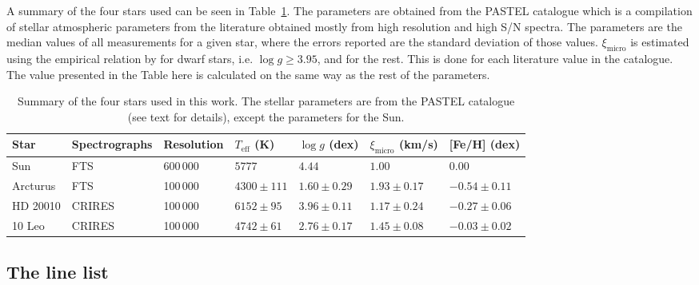 \documentclass{aa}
\begin{document}
A summary of the four stars used can be seen in Table~\ref{tab:stars}. The
parameters are obtained from the PASTEL catalogue \citep{Soubiran2016} which is
a compilation of stellar atmospheric parameters from the literature obtained
mostly from high resolution and high S/N spectra. The parameters are the median
values of all measurements for a given star, where the errors reported are the
standard deviation of those values. $\xi_\mathrm{micro}$ is estimated using the
empirical relation by \citet{Tsantaki2013} for dwarf stars, i.e. $\log
g\ge3.95$, and \citet{Adibekyan2015} for the rest. This is done for each
literature value in the catalogue. The value presented in the Table here is
calculated on the same way as the rest of the parameters.
\begin{table}[htb!]
    \caption{Summary of the four stars used in this work. The stellar parameters
             are from the PASTEL catalogue \citep{Soubiran2016} (see text for
             details), except the parameters for the Sun.}
    \label{tab:stars}
    \centering
    \begin{tabular}{lllllll}
      \hline\hline
        Star        & Spectrographs  & Resolution  & $T_\mathrm{eff}$ (K) &  $\log g$ (dex)  &   $\xi_\mathrm{micro}$ (km/s)   & [Fe/H] (dex)      \\
      \hline
        Sun         & FTS            & 600\,000    & $5777$               &  $4.44$          &    $1.00$                       & $ 0.00$          \\
        Arcturus    & FTS            & 100\,000    & $4300 \pm 111$       &  $1.60 \pm 0.29$ &    $1.93 \pm 0.17$              & $-0.54 \pm 0.11$ \\
        HD 20010    & CRIRES         & 100\,000    & $6152 \pm  95$       &  $3.96 \pm 0.11$ &    $1.17 \pm 0.24$              & $-0.27 \pm 0.06$ \\
        10 Leo      & CRIRES         & 100\,000    & $4742 \pm  61$       &  $2.76 \pm 0.17$ &    $1.45 \pm 0.08$              & $-0.03 \pm 0.02$ \\
      \hline
    \end{tabular}
\end{table}

\subsection{The line list}
\end{document}
